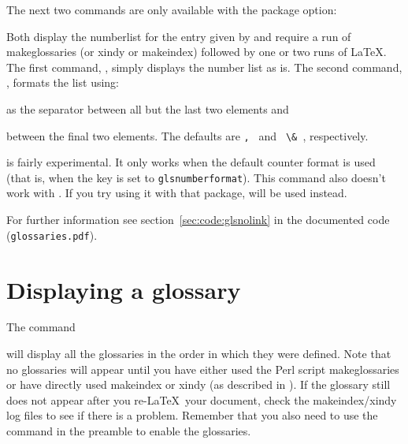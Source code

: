 \documentclass[report]{nlctdoc}
\newcommand*{\gloskey}[2][newglossaryentry]{\csopt{#1}{#2}}
\begin{document}
The next two commands are only available with the
 package option:
\begin{definition}[\DescribeMacro{\glsentrynumberlist}]
\end{definition}
\begin{definition}[\DescribeMacro{\glsdisplaynumberlist}]
\end{definition}
Both display the \gls{numberlist} for the entry given by
 and require a run of \gls{makeglossaries} (or
\gls{xindy} or \gls{makeindex}) followed by one or two runs of
\LaTeX. The first command, , simply displays
the number list as is. The second command,
\linebreak{}, formats the list using:
\begin{definition}[\DescribeMacro{\glsnumlistsep}]
\end{definition}
as the separator between all but the last two elements and
\begin{definition}[\DescribeMacro{\glsnumlistlastsep}]
\end{definition}
between the final two elements. The defaults are
\verb*|, | and \verb*| \& |, respectively.

\begin{important}
 is fairly experimental. It only works when
the default counter format is used (that is, when the
\gloskey[glslink]{format} key is set to \texttt{glsnumberformat}).
This command also doesn't work with . If you try using
it with that package,  will be used instead.
\end{important}

For further information see \ifpdf section~\ref*{sec:code:glsnolink}
\fi {} in the documented code (\texttt{glossaries.pdf}).

\chapter{Displaying a glossary}
\label{sec:printglossary}

The command
\begin{definition}[\DescribeMacro{\printglossaries}]
\end{definition}
will display all the glossaries in the order in which they were
defined. Note that no glossaries will appear until you have either
used the Perl script \gls{makeglossaries} or have directly used
\gls{makeindex} or \gls{xindy} (as described in
). If the glossary 
still does not appear after you re-\LaTeX\ your document, check the
\gls*{makeindex}/\gls*{xindy} log files to see if there is a problem.
Remember that you also need to use the command 
in the preamble to enable the glossaries.
\end{document}
